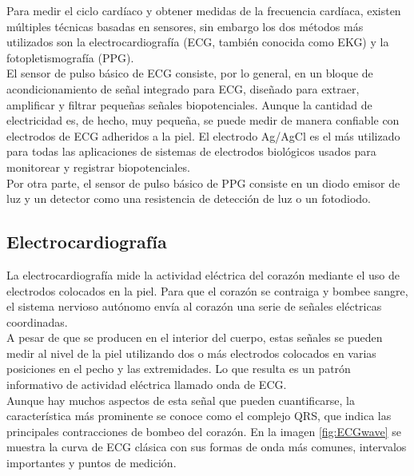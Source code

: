 	Para medir el ciclo cardíaco y obtener medidas de la frecuencia cardíaca, existen múltiples técnicas basadas en sensores, sin embargo los dos métodos más utilizados son la electrocardiografía (ECG, también conocida como EKG) y la fotopletismografía (PPG). \\
	
	El sensor de pulso básico de ECG consiste, por lo general, en un bloque de acondicionamiento de señal integrado para ECG, diseñado para extraer, amplificar y filtrar pequeñas señales biopotenciales. Aunque la cantidad de electricidad es, de hecho, muy pequeña, se puede medir de manera confiable con electrodos de ECG adheridos a la piel. El electrodo Ag/AgCl es el más utilizado para todas las aplicaciones de sistemas de electrodos biológicos usados para monitorear y registrar biopotenciales. \\
	
	Por otra parte, el sensor de pulso básico de PPG consiste en un diodo emisor de luz y un detector como una resistencia de detección de luz o un fotodiodo. 

	\subsection{Electrocardiografía}
		La electrocardiografía mide la actividad eléctrica del corazón mediante el uso de electrodos colocados en la piel. Para que el corazón se contraiga y bombee sangre, el sistema nervioso autónomo envía al corazón una serie de señales eléctricas coordinadas. \\
		
		A pesar de que se producen en el interior del cuerpo, estas señales se pueden medir al nivel de la piel utilizando dos o más electrodos colocados en varias posiciones en el pecho y las extremidades. Lo que resulta es un patrón informativo de actividad eléctrica llamado onda de ECG. \\
		
		Aunque hay muchos aspectos de esta señal que pueden cuantificarse, la característica más prominente se conoce como el complejo QRS, que indica las principales contracciones de bombeo del corazón. En la imagen \ref{fig:ECGwave} se muestra la curva de ECG clásica con sus formas de onda más comunes, intervalos importantes y puntos de medición. \\
		
